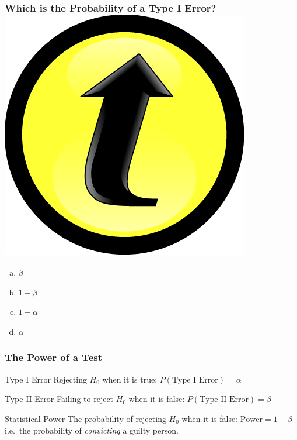 \documentclass[handout]{beamer}
\begin{document}
\begin{frame}
\frametitle{Which is the Probability of a Type I Error? \includegraphics[scale = 0.05]{./images/clicker}}

\begin{enumerate}[(a)]
	\item $\beta$
	\item $1 - \beta$
	\item $1-\alpha$
	\item $\alpha$
\end{enumerate}

\end{frame}
\begin{frame}[c]\frametitle{The Power of a Test}
    
\begin{block}
	{Type I Error} Rejecting $H_0$ when it is true:  $P(\mbox{Type I Error}) = \alpha$
\end{block}

\begin{block}
	{Type II Error} Failing to reject $H_0$ when it is false: \alert{$P(\mbox{Type II Error}) =\beta$}
\end{block}

\begin{alertblock}
	{Statistical Power} The probability of rejecting $H_0$ when it is false: \alert{$\mbox{Power} = 1 -\beta $}\\ i.e.\ the probability of \emph{convicting} a guilty person.
\end{alertblock}

\vspace{1em}

\begin{center}
\alert{}
\end{center}
\end{frame}
\end{document}
